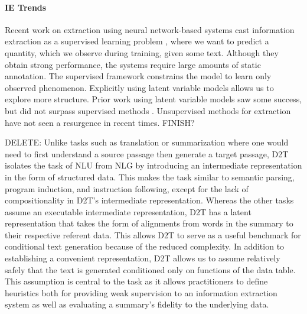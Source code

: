 \documentclass[11pt]{article}
\begin{document}
\paragraph{IE Trends}
\begin{comment}
\item Recent work using neural network-based systems cast information extraction
as a supervised problem
\citep{wiseman2017d2t,dossantos2015classification,collobert2011nlpscratch,weissenborn17}.
\item Previously \citet{liang2009semalign} formulated an unsupervised approach
    to aligning segments in summaries to records.
\item Highlight: Relatively closed domain, but have facts that are functions of the
given data table as well as .
\end{comment}

Recent work on extraction using neural network-based systems cast information extraction
as a supervised learning problem
\citep{wiseman2017d2t,dossantos2015classification,collobert2011nlpscratch,weissenborn17},
where we want to predict a quantity, which we observe during training,
given some text.
Although they obtain strong performance, the systems require large amounts of static annotation.
The supervised framework constrains the model to learn only observed phenomenon.
Explicitly using latent variable models allows us to explore more structure. 
Prior work using latent variable models saw some success,
but did not surpass supervised methods
\citep{liang2009semalign,grenager2005unsup}.
Unsupervised methods for extraction have not seen a resurgence in recent times.
FINISH?

DELETE:
Unlike tasks such as translation or summarization where one would
need to first understand a source passage then generate a target passage,
D2T isolates the task of NLU from NLG by introducing an intermediate representation in
the form of structured data.
This makes the task similar to semantic parsing, program induction, and instruction following,
except for the lack of compositionality in D2T's intermediate representation.
Whereas the other tasks assume an executable intermediate representation,
D2T has a latent representation that takes the form of alignments from 
words in the summary to their respective referent data.
This allows D2T to serve as a useful benchmark for conditional text generation
because of the reduced complexity.
In addition to establishing a convenient representation,
D2T allows us to assume relatively safely that the text is generated conditioned only on
functions of the data table.
This assumption is central to the task as it allows
practitioners to define heuristics both for providing weak supervision to an
information extraction system as well as evaluating a summary's fidelity
to the underlying data.
\end{document}
